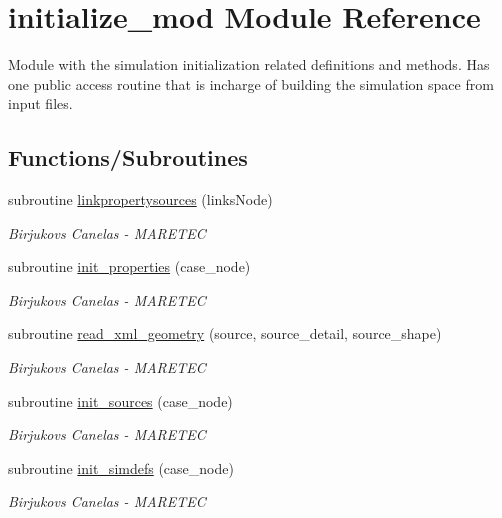 \hypertarget{namespaceinitialize__mod}{}\section{initialize\+\_\+mod Module Reference}
\label{namespaceinitialize__mod}


Module with the simulation initialization related definitions and methods. Has one public access routine that is incharge of building the simulation space from input files.  


\subsection*{Functions/\+Subroutines}
\begin{DoxyCompactItemize}
\item 
subroutine \hyperlink{namespaceinitialize__mod_af38ade977df8d56db1d125bc4cc03a4a}{linkpropertysources} (links\+Node)
\begin{DoxyCompactList}\small\item\em Birjukovs Canelas -\/ M\+A\+R\+E\+T\+EC \end{DoxyCompactList}\item 
subroutine \hyperlink{namespaceinitialize__mod_a4c7a93dca8bb7b573e91f877033ab22a}{init\+\_\+properties} (case\+\_\+node)
\begin{DoxyCompactList}\small\item\em Birjukovs Canelas -\/ M\+A\+R\+E\+T\+EC \end{DoxyCompactList}\item 
subroutine \hyperlink{namespaceinitialize__mod_aebe8236f74bc6665b16463683c478602}{read\+\_\+xml\+\_\+geometry} (source, source\+\_\+detail, source\+\_\+shape)
\begin{DoxyCompactList}\small\item\em Birjukovs Canelas -\/ M\+A\+R\+E\+T\+EC \end{DoxyCompactList}\item 
subroutine \hyperlink{namespaceinitialize__mod_aae6a35bca190cdf65a6146f254264cd1}{init\+\_\+sources} (case\+\_\+node)
\begin{DoxyCompactList}\small\item\em Birjukovs Canelas -\/ M\+A\+R\+E\+T\+EC \end{DoxyCompactList}\item 
subroutine \hyperlink{namespaceinitialize__mod_a18736cca205403067232125b8e510ab2}{init\+\_\+simdefs} (case\+\_\+node)
\begin{DoxyCompactList}\small\item\em Birjukovs Canelas -\/ M\+A\+R\+E\+T\+EC \end{DoxyCompactList}\item 

\end{DoxyCompactItemize}
